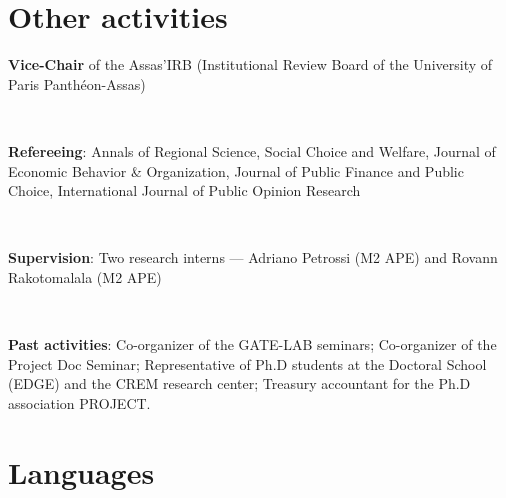 \documentclass[11pt,a4paper,sans,unicode]{moderncv} %
\begin{document}
\hspace{2mm}



\section{Other activities}

\textbf{Vice-Chair} of the Assas'IRB (Institutional Review Board of the University of Paris Panthéon-Assas)

\

\textbf{Refereeing}: Annals of Regional Science, Social Choice and Welfare, Journal of Economic Behavior \& Organization, Journal of Public Finance and Public Choice, International Journal of Public Opinion Research

\

\textbf{Supervision}: Two research interns --- Adriano Petrossi (M2 APE) and Rovann Rakotomalala (M2 APE)

\

\textbf{Past activities}: Co-organizer of the GATE-LAB seminars; Co-organizer of the Project Doc Seminar; Representative of Ph.D students at the Doctoral School (EDGE) and the CREM research center; Treasury accountant for the Ph.D association PROJECT.



\section{Languages}


\end{document}
